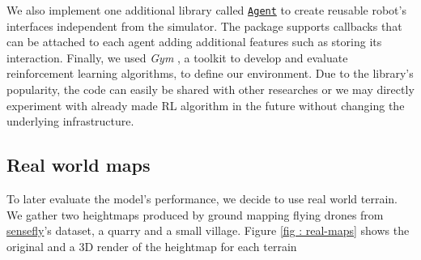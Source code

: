 \documentclass[../document.tex]{subfiles}
\begin{document}
We also implement one additional library called \href{https://github.com/FrancescoSaverioZuppichini/Master-Thesis/tree/master/core/simulation/agent}{\texttt{Agent}} to create reusable robot's interfaces independent from the simulator. The package supports callbacks that can be attached to each agent adding additional features such as storing its interaction. Finally, we used \emph{Gym} \cite{gym}, a toolkit to develop and evaluate reinforcement learning algorithms, to define our environment. Due to the library's popularity, the code can easily be shared with other researches or we may directly experiment with already made RL algorithm in the future without changing the underlying infrastructure.

\subsection{Real world maps}
To later evaluate the model's performance, we decide to use real world terrain. We gather two heightmaps produced by ground mapping flying drones from \href{https://www.sensefly.com/education/datasets/}{sensefly}'s dataset, a quarry and a small village. Figure \ref{fig : real-maps} shows the original and a 3D render of the heightmap for each terrain
\end{document}
